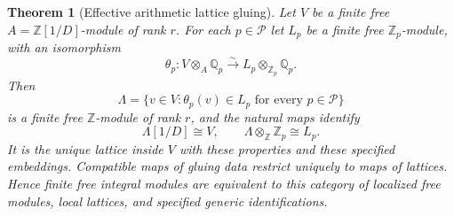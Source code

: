 \documentclass[11pt]{article}
\newtheorem{theorem}{Theorem}[section]
\theoremstyle{definition}
\theoremstyle{remark}
\begin{document}
\begin{theorem}[Effective arithmetic lattice gluing]\label{thm:lattice-gluing}
Let $V$ be a finite free $A=\mathbb Z[1/D]$-module of rank $r$. For each $p\in\mathcal P$ let $L_p$ be a finite free $\mathbb Z_p$-module, with an isomorphism
\[
 \theta_p:V\otimes_A\mathbb Q_p\xrightarrow{\sim}
 L_p\otimes_{\mathbb Z_p}\mathbb Q_p.
\]
Then
\[
 \Lambda=\{v\in V:\theta_p(v)\in L_p\text{ for every }p\in\mathcal P\}
\]
is a finite free $\mathbb Z$-module of rank $r$, and the natural maps identify
\[
 \Lambda[1/D]\cong V,\qquad
 \Lambda\otimes_{\mathbb Z}\mathbb Z_p\cong L_p.
\]
It is the unique lattice inside $V$ with these properties and these specified embeddings. Compatible maps of gluing data restrict uniquely to maps of lattices. Hence finite free integral modules are equivalent to this category of localized free modules, local lattices, and specified generic identifications.
\end{theorem}
\end{document}
